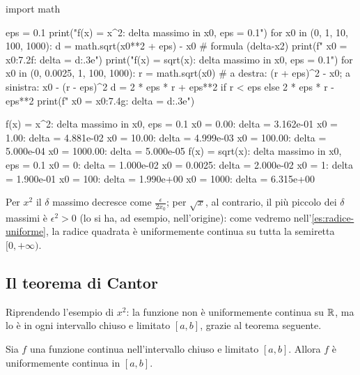 \begin{python}
import math

eps = 0.1
print("f(x) = x^2: delta massimo in x0, eps = 0.1")
for x0 in (0, 1, 10, 100, 1000):
    d = math.sqrt(x0**2 + eps) - x0            # formula (delta-x2)
    print(f"   x0 = {x0:7.2f}:  delta = {d:.3e}")
print("f(x) = sqrt(x): delta massimo in x0, eps = 0.1")
for x0 in (0, 0.0025, 1, 100, 1000):
    r = math.sqrt(x0)
    # a destra: (r + eps)^2 - x0;  a sinistra: x0 - (r - eps)^2
    d = 2 * eps * r + eps**2 if r < eps else 2 * eps * r - eps**2
    print(f"   x0 = {x0:7.4g}:  delta = {d:.3e}")
\end{python}
\begin{risultato}
f(x) = x^2: delta massimo in x0, eps = 0.1
   x0 =    0.00:  delta = 3.162e-01
   x0 =    1.00:  delta = 4.881e-02
   x0 =   10.00:  delta = 4.999e-03
   x0 =  100.00:  delta = 5.000e-04
   x0 = 1000.00:  delta = 5.000e-05
f(x) = sqrt(x): delta massimo in x0, eps = 0.1
   x0 =       0:  delta = 1.000e-02
   x0 =  0.0025:  delta = 2.000e-02
   x0 =       1:  delta = 1.900e-01
   x0 =     100:  delta = 1.990e+00
   x0 =    1000:  delta = 6.315e+00
\end{risultato}

Per $x^{2}$ il $\delta$ massimo decresce come $\frac\epsilon{2x_{0}}$; per $\sqrt x$, al
contrario, il più piccolo dei $\delta$ massimi è $\epsilon^{2}>0$ (lo si ha, ad esempio,
nell'origine):
come vedremo nell'\cref{es:radice-uniforme}, la radice quadrata è uniformemente continua
su tutta la semiretta $[0,+\infty)$.

\subsection{Il teorema di Cantor}

Riprendendo l'esempio di $x^{2}$: la funzione non è uniformemente continua su $\mathbb{R}$, ma lo
è in ogni intervallo chiuso e limitato $[a,b]$, grazie al teorema seguente.

\begin{teorema}[di Cantor]\label{teo:cantor}
Sia $f$ una funzione continua nell'intervallo chiuso e limitato $[a,b]$. Allora $f$ è
uniformemente continua in $[a,b]$.
\end{teorema}

\begin{schema}
\end{schema}

